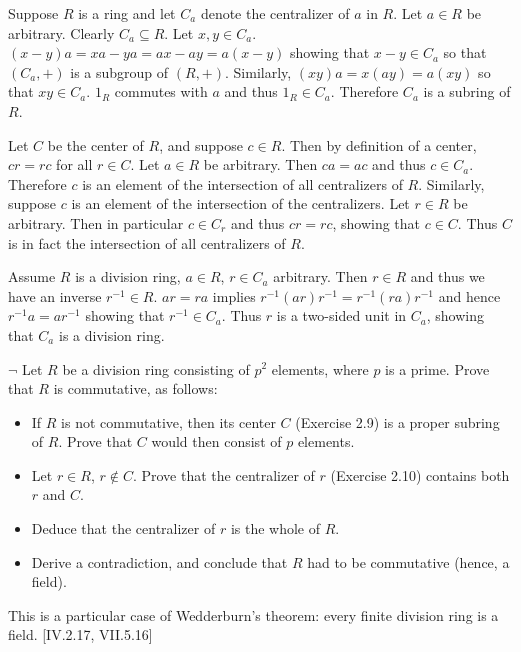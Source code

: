 \begin{solution}
	Suppose $R$ is a ring and let $C_a$ denote the centralizer of $a$ in $R$. Let $a \in R$ be arbitrary. Clearly $C_a \subseteq R$. Let $x, y \in C_a$. $(x - y)a = xa - ya = ax - ay = a(x - y)$ showing that $x - y \in C_a$ so that $(C_a, +)$ is a subgroup of $(R, +)$. Similarly, $(xy)a = x(ay) = a(xy)$ so that $xy \in C_a$. $1_R$ commutes with $a$ and thus $1_R \in C_a$. Therefore $C_a$ is a subring of $R$.
	
	Let $C$ be the center of $R$, and suppose $c \in R$. Then by definition of a center, $cr = rc$ for all $r \in C$. Let $a \in R$ be arbitrary. Then $ca = ac$ and thus $c \in C_a$. Therefore $c$ is an element of the intersection of all centralizers of $R$. Similarly, suppose $c$ is an element of the intersection of the centralizers. Let $r \in R$ be arbitrary. Then in particular $c \in C_r$ and thus $cr = rc$, showing that $c \in C$. Thus $C$ is in fact the intersection of all centralizers of $R$.
	
	Assume $R$ is a division ring, $a \in R$, $r \in C_a$ arbitrary. Then $r \in R$ and thus we have an inverse $r^{-1} \in R$. $ar = ra$ implies $r^{-1}(ar)r^{-1} = r^{-1}(ra)r^{-1}$ and hence $r^{-1}a = ar^{-1}$ showing that $r^{-1} \in C_a$. Thus $r$ is a two-sided unit in $C_a$, showing that $C_a$ is a division ring.
\end{solution}

\begin{problem}
	$\neg$ Let $R$ be a division ring consisting of $p^2$ elements, where $p$ is a prime. Prove that $R$ is commutative, as follows:
	\begin{itemize}
		\item If $R$ is not commutative, then its center $C$ (Exercise 2.9) is a proper subring of $R$. Prove that $C$ would then consist of $p$ elements.
		\item Let $r \in R$, $r \not \in C$. Prove that the centralizer of $r$ (Exercise 2.10) contains both $r$ and $C$.
		\item Deduce that the centralizer of $r$ is the whole of $R$.
		\item Derive a contradiction, and conclude that $R$ had to be commutative (hence, a field).
	\end{itemize}
	This is a particular case of Wedderburn's theorem: every finite division ring is a field. [IV.2.17, VII.5.16]
\end{problem}

